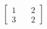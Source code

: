 \documentclass[preview]{standalone}
\begin{document}
\begin{align*}
\begin{bmatrix} 1 & \quad 2 \\ 3 & \quad 2 \end{bmatrix}
\end{align*}
\end{document}
